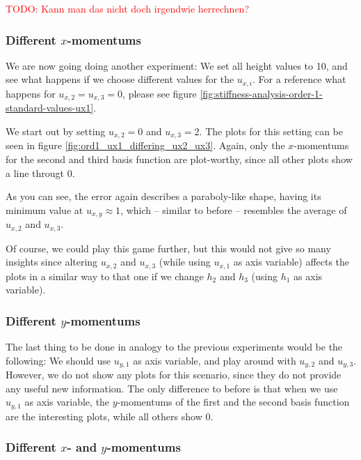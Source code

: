 \documentclass{article}
\newcommand{\todo}[1]{\textcolor{red}{TODO: #1}}
\begin{document}
\todo{Kann man das nicht doch irgendwie herrechnen?}

\subsubsection{Different $x$-momentums}
\label{sec:stiffness-analysis-ord1-nonstandard-diff-ux}

We are now going doing another experiment: We set all height values to 10, and see what happens if we choose different values for the $u_{x,i}$. For a reference what happens for $u_{x,2}=u_{x,3}=0$, please see figure \ref{fig:stiffness-analysis-order-1-standard-values-ux1}.

We start out by setting $u_{x,2}=0$ and $u_{x,3}=2$. The plots for this setting can be seen in figure \ref{fig:ord1_ux1_differing_ux2_ux3}. Again, only the $x$-momentums for the second and third basis function are plot-worthy, since all other plots show a line througt 0.



As you can see, the error again describes a paraboly-like shape, having its minimum value at $u_{x,y}\approx 1$, which -- similar to before -- resembles the average of $u_{x,2}$ and $u_{x,3}$.

Of course, we could play this game further, but this would not give so many insights since altering $u_{x,2}$ and $u_{x,3}$ (while using $u_{x,1}$ as axis variable) affects the plots in a similar way to that one if we change $h_2$ and $h_3$ (using $h_1$ as axis variable).

\subsubsection{Different $y$-momentums}
\label{sec:stiffness-analysis-ord1-nonstandard-diff-uy}

The last thing to be done in analogy to the previous experiments would be the following: We should use $u_{y,1}$ as axis variable, and play around with $u_{y,2}$ and $u_{y,3}$. However, we do not show any plots for this scenario, since they do not provide any useful new information. The only difference to before is that when we use $u_{y,1}$ as axis variable, the $y$-momentums of the first and the second basis function are the interesting plots, while all others show 0.

\subsubsection{Different $x$- and $y$-momentums}
\label{sec:stiffness-analysis-different-ux-uy-momentums}
\end{document}
